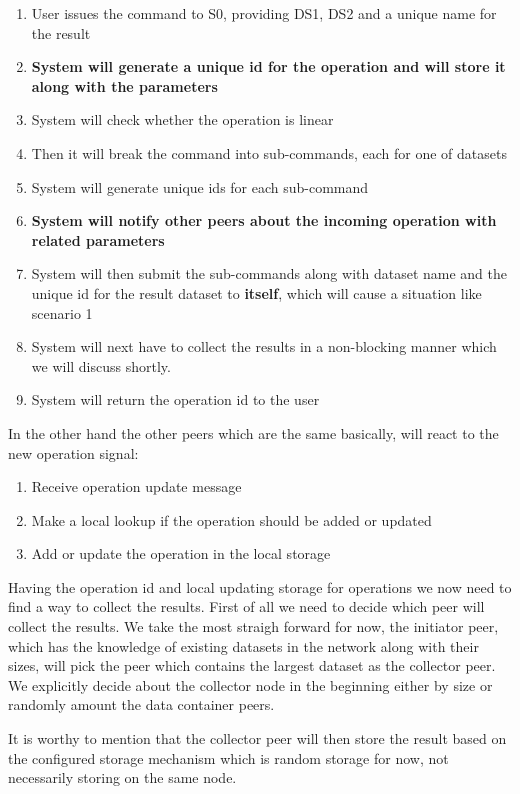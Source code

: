 \begin{enumerate}
\item User issues the command to S0, providing DS1, DS2 and a unique name for the result
\item \textbf{System will generate a unique id for the operation and will store it along with the parameters}
\item System will check whether the operation is linear
\item Then it will break the command into sub-commands, each for one of datasets
\item System will generate unique ids for each sub-command
\item \textbf{System will notify other peers about the incoming operation with related parameters}
\item System will then submit the sub-commands along with dataset name and the unique id for the result dataset
to \textbf{itself}, which will cause a situation like scenario 1
\item System will next have to collect the results in a non-blocking manner which we will discuss shortly.
\item System will return the operation id to the user
\end{enumerate}

In the other hand the other peers which are the same basically, will react to the new operation signal:

\begin{enumerate}
\item Receive operation update message
\item Make a local lookup if the operation should be added or updated
\item Add or update the operation in the local storage
\end{enumerate}

Having the operation id and local updating storage for operations we now need to find a way to collect the results.
First of all we need to decide which peer will collect the results. We take the most straigh forward for now, the 
initiator peer, which has the knowledge of existing datasets in the network along with their sizes, will pick the 
peer which contains the largest dataset as the collector peer. We explicitly decide about the collector node in the
beginning either by size or randomly amount the data container peers.

It is worthy to mention that the collector peer will then store the result based on the configured storage mechanism 
which is random storage for now, not necessarily storing on the same node.

